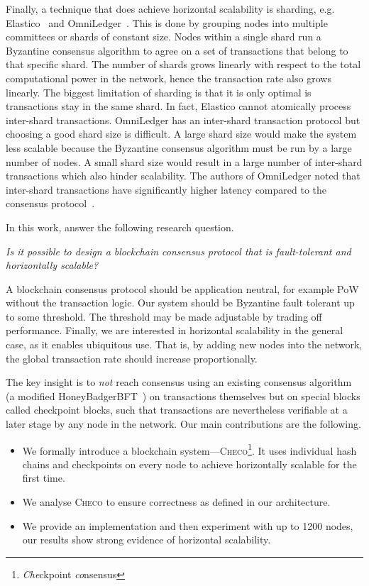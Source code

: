 Finally, a technique that does achieve horizontal scalability is sharding, e.g. Elastico~\cite{luu2016elastico} and OmniLedger~\cite{kokoris2017omniledger}.
This is done by grouping nodes into multiple committees or shards of constant size.
Nodes within a single shard run a Byzantine consensus algorithm to agree on a set of transactions that belong to that specific shard.
The number of shards grows linearly with respect to the total computational power in the network, hence the transaction rate also grows linearly.
The biggest limitation of sharding is that it is only optimal is transactions stay in the same shard.
In fact, Elastico cannot atomically process inter-shard transactions.
OmniLedger has an inter-shard transaction protocol but choosing a good shard size is difficult.
A large shard size would make the system less scalable because the Byzantine consensus algorithm must be run by a large number of nodes.
A small shard size would result in a large number of inter-shard transactions which also hinder scalability.
The authors of OmniLedger noted that inter-shard transactions have significantly higher latency compared to the consensus protocol~\cite{kokoris2017omniledger}.

In this work, answer the following research question.
\begin{displayquote}
\emph{Is it possible to design a blockchain consensus protocol that is fault-tolerant and horizontally scalable?}
\end{displayquote}
A blockchain consensus protocol should be application neutral,
for example PoW without the transaction logic.
Our system should be Byzantine fault tolerant up to some threshold.
The threshold may be made adjustable by trading off performance.
Finally, we are interested in horizontal scalability in the general case, as it enables ubiquitous use.
That is, by adding new nodes into the network, the global transaction rate should increase proportionally.

The key insight is to \emph{not} reach consensus using an existing consensus algorithm (a modified HoneyBadgerBFT~\cite{miller2016honey}) on transactions themselves but on special blocks called checkpoint blocks,
such that transactions are nevertheless verifiable at a later stage by any node in the network.
Our main contributions are the following.
\begin{itemize}
    \item We formally introduce a blockchain system---\textsc{Checo}\footnote{\emph{Che}ckpoint \emph{co}nsensus}.
        It uses individual hash chains and checkpoints on every node to achieve
        horizontally scalable for the first time.
    \item We analyse \textsc{Checo} to ensure correctness as defined in our architecture.
    \item We provide an implementation and then experiment with up to 1200 nodes,
        our results show strong evidence of horizontal scalability.
\end{itemize}

